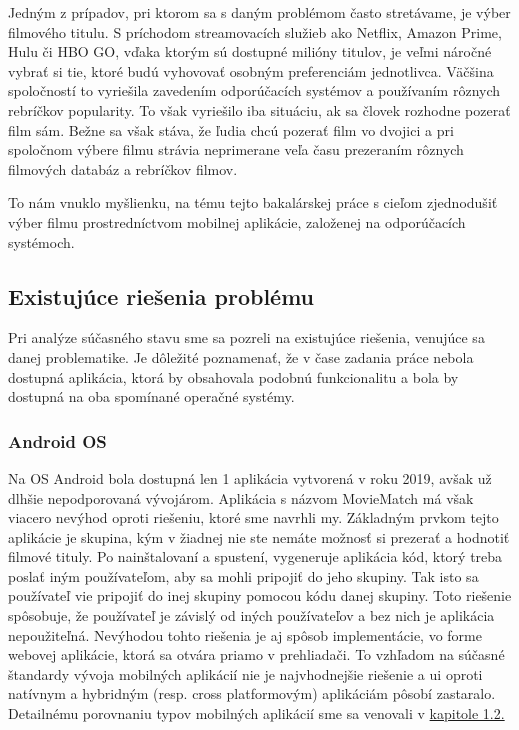 Jedným z prípadov, pri ktorom sa s daným problémom často stretávame, je výber filmového titulu. S príchodom streamovacích služieb ako Netflix, Amazon Prime, Hulu či HBO GO, vďaka ktorým sú dostupné milióny titulov, je veľmi náročné vybrať si tie, ktoré budú vyhovovať osobným preferenciám jednotlivca. Väčšina spoločností to vyriešila zavedením odporúčacích systémov a používaním rôznych rebríčkov popularity. To však vyriešilo iba situáciu, ak sa človek rozhodne pozerať film sám. Bežne sa však stáva, že ľudia chcú pozerať film vo dvojici a pri spoločnom výbere filmu strávia neprimerane veľa času prezeraním rôznych filmových databáz a rebríčkov filmov. 

To nám vnuklo myšlienku, na tému tejto bakalárskej práce s cieľom zjednodušiť výber filmu  prostredníctvom mobilnej aplikácie, založenej na odporúčacích systémoch.

\subsection{Existujúce riešenia problému}
Pri analýze súčasného stavu sme sa pozreli na existujúce riešenia, venujúce sa danej problematike. Je dôležité poznamenať, že v čase zadania práce nebola dostupná aplikácia, ktorá by obsahovala podobnú funkcionalitu a bola by dostupná na oba spomínané operačné systémy. 
\subsubsection{Android OS}
Na OS Android bola dostupná len 1 aplikácia vytvorená v roku 2019, avšak už dlhšie nepodporovaná vývojárom. Aplikácia s názvom MovieMatch má však viacero nevýhod oproti riešeniu, ktoré sme navrhli my. Základným prvkom tejto aplikácie je skupina, kým v žiadnej nie ste nemáte možnosť si prezerať a hodnotiť filmové tituly. Po nainštalovaní a spustení, vygeneruje aplikácia kód, ktorý treba poslať iným používateľom, aby sa mohli pripojiť do jeho skupiny. Tak isto sa používateľ vie pripojiť do inej skupiny pomocou kódu danej skupiny. Toto riešenie spôsobuje, že používateľ je závislý od iných používateľov a bez nich je aplikácia nepoužiteľná. Nevýhodou tohto riešenia je aj spôsob implementácie, vo forme webovej aplikácie, ktorá sa otvára priamo v prehliadači. To vzhľadom na súčasné štandardy vývoja mobilných aplikácií nie je najvhodnejšie riešenie a \acrshort{ui} oproti natívnym a hybridným (resp. cross platformovým) aplikáciám pôsobí zastaralo. Detailnému porovnaniu typov mobilných aplikácií sme sa venovali v \hyperref[sec:typy aplikacii]{kapitole 1.2.}
